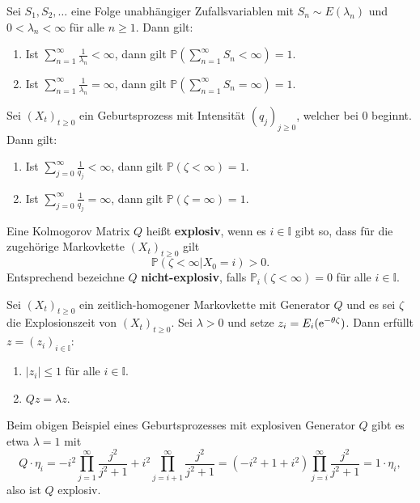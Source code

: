 \begin{prop}
  Sei $S_1,S_2,\dots$ eine Folge unabhängiger Zufallsvariablen mit $S_n\sim E(\lambda_n)$ und $0<\lambda_n<\infty$ für alle $n\geq1$. Dann gilt:
  \begin{enumerate}
      \item Ist $\sum_{n=1}^\infty \frac{1}{\lambda_n}< \infty$, dann gilt $\mathbb P(\sum_{n=1}^\infty S_n <\infty)=1$.
      \item Ist $\sum_{n=1}^\infty \frac{1}{\lambda_n}=\infty$, dann gilt $\mathbb P(\sum_{n=1}^\infty S_n=\infty)=1$.
  \end{enumerate}
\end{prop}

\begin{prop}
  Sei $(X_t)_{t\geq0}$ ein Geburtsprozess mit Intensität $(q_j)_{j\geq0}$, welcher bei $0$ beginnt. Dann gilt:
  \begin{enumerate}
      \item Ist $\sum_{j=0}^\infty \frac{1}{q_j}< \infty$, dann gilt $\mathbb P(\zeta <\infty)=1$.
      \item Ist $\sum_{j=0}^\infty \frac{1}{q_j}= \infty$, dann gilt $\mathbb P(\zeta =\infty)=1$.
  \end{enumerate}
\end{prop}



\begin{defi}[Explosivität]
  Eine Kolmogorov Matrix $Q$ heißt \textbf{explosiv}, wenn es $i\in\mathbb I$ gibt so, dass für die zugehörige Markovkette $(X_t)_{t\geq0}$ gilt $$\mathbb P(\zeta<\infty|X_0=i)>0.$$
  Entsprechend bezeichne  $Q$ \textbf{nicht-explosiv}, falls $\mathbb P_i(\zeta<\infty)=0$ für alle $i\in \mathbb I$.
\end{defi}


\begin{satz}
  Sei $(X_t)_{t\geq0}$ ein zeitlich-homogener Markovkette mit Generator $Q$ und es sei $\zeta$ die Explosionszeit von $(X_t)_{t\geq0}$. Sei $\lambda>0$ und setze $z_i=E_i(\text e^{-\theta \zeta})$. Dann erfüllt $z=(z_i)_{i\in\mathbb I}$:
  \begin{enumerate}
      \item $|z_i|\leq 1$ für alle $i\in\mathbb I$.
      \item $Qz = \lambda z$.
  \end{enumerate}
\end{satz}


\begin{bsp}Beim obigen  Beispiel eines Geburtsprozesses mit explosiven Generator $Q$ gibt es etwa $\lambda =1$ mit $$Q\cdot\eta_i=-i^2\prod_{j=1}^\infty \frac{j^2}{j^2+1}+i^2\prod_{j=i+1}^\infty\frac{j^2}{j^2+1}=(-i^2+1+i^2)\prod_{j=i}^\infty\frac{j^2}{j^2+1}=1\cdot\eta_i,$$ also ist $Q$ explosiv.
\end{bsp}


